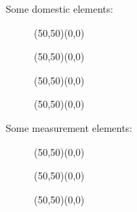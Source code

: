 	Some domestic elements:
	\begin{figure}[H]
		\vspace{1cm}
		\begin{center}
		\begin{picture}(50,50)(0,0)
		\end{picture}
		\begin{picture}(50,50)(0,0)
		\end{picture}
		\begin{picture}(50,50)(0,0)
		\end{picture}
		\begin{picture}(50,50)(0,0)
		\end{picture}
		\end{center}
	\end{figure}
	
	Some measurement elements:
	\begin{figure}[H]
		\vspace{1cm}
		\begin{center}
		\begin{picture}(50,50)(0,0)
		\end{picture}
		\begin{picture}(50,50)(0,0)
		\end{picture}
		\begin{picture}(50,50)(0,0)
		\end{picture}\\[1cm]
		\end{center}
	\end{figure}
	
